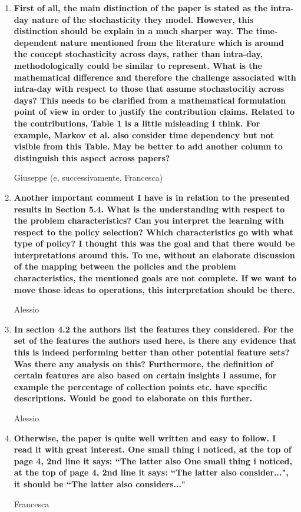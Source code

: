 \documentclass[11pt]{article}
\begin{document}
\begin{enumerate}
\item \textbf{First of all, the main distinction of the paper is stated as the intra-day nature of the
stochasticity they model. However, this distinction should be explain in a much sharper
way. The time-dependent nature mentioned from the literature which is around the
concept stochasticity across days, rather than intra-day, methodologically could be similar
to represent. What is the mathematical difference and therefore the challenge associated with intra-day with respect to those that assume stochastocitiy across days? This needs to be clarified from a mathematical formulation point of view in order to justify the
contribution claims. Related to the contributions, Table 1 is a little misleading I think. For example, Markov et
al. also consider time dependency but not visible from this Table. May be better to add
another column to distinguish this aspect across papers? }
    
	\vspace{1mm}
Giuseppe (e, successivamente, Francesca)
 		
		
	\item \textbf{Another important comment I have is in relation to the presented results in Section 5.4.
What is the understanding with respect to the problem characteristics? Can you interpret
the learning with respect to the policy selection? Which characteristics go with what type of policy? I thought this was the goal and that there would be interpretations around this.
To me, without an elaborate discussion of the mapping between the policies and the
problem characteristics, the mentioned goals are not complete. If we want to move those
ideas to operations, this interpretation should be there.} 
    
\vspace{1mm}
Alessio

	

	 \item \textbf{In section 4.2 the authors list the features they considered. For the set of the features the
authors used here, is there any evidence that this is indeed performing better than other
potential feature sets? Was there any analysis on this? Furthermore, the definition of
certain features are also based on certain insights I assume, for example the percentage of
collection points etc. have specific descriptions. Would be good to elaborate on this
further.} 
	 
	 \vspace{1mm}
Alessio  

	 \item \textbf{Otherwise, the paper is quite well written and easy to follow. I read it with great interest.
One small thing i noticed, at the top of page 4, 2nd line it says: “The latter also
One small thing i noticed, at the top of page 4, 2nd line it says: “The latter also
consider...", it should be “The latter also considers..."} 
	 
	 \vspace{1mm}
Francesca

\end{enumerate}
\end{document}
